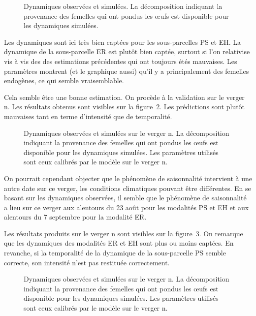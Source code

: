 \begin{figure}[ht]
 \centering
 \caption{Dynamiques observées et simulées. La décomposition indiquant la provenance des femelles qui ont pondus les œufs est disponible pour les dynamiques simulées.}
 \label{fig:D}
\end{figure}


Les dynamiques sont ici très bien captées pour les sous-parcelles PS et EH.
La dynamique de la sous-parcelle ER est plutôt bien captée, surtout si l'on relativise vis à vis des des estimations précédentes qui ont toujours étés mauvaises.
Les paramètres montrent (et le graphique aussi) qu'il y a principalement des femelles endogènes, ce qui semble vraisemblable.



Cela semble être une bonne estimation.
On procède à la validation sur le verger n.
Les résultats obtenus sont visibles sur la figure~\ref{fig:vg2_15s}.
Les prédictions sont plutôt mauvaises tant en terme d'intensité que de temporalité.

\begin{figure}[ht]
 \centering
 \caption{Dynamiques observées et simulées sur le verger n. La décomposition indiquant la provenance des femelles qui ont pondus les œufs est disponible pour les dynamiques simulées.
 Les paramètres utilisés sont ceux calibrés par le modèle sur le verger n.}
 \label{fig:vg2_15s}
\end{figure}


On pourrait cependant objecter que le phénomène de saisonnalité intervient à une autre date sur ce verger, les conditions climatiques pouvant être différentes.
En se basant sur les dynamiques observées, il semble que le phénomène de saisonnalité a lieu sur ce verger aux alentours du 23 août pour les modalités PS et EH et aux alentours du 7 septembre pour la modalité ER.

Les résultats produits sur le verger n sont visibles sur la figure~\ref{fig:D2}.
On remarque que les dynamiques des modalités ER et EH sont plus ou moins captées.
En revanche, si la temporalité de la dynamique de la sous-parcelle PS semble correcte, son intensité n'est pas restituée correctement.
\begin{figure}[ht]
 \centering
 \caption{Dynamiques observées et simulées sur le verger n. La décomposition indiquant la provenance des femelles qui ont pondus les œufs est disponible pour les dynamiques simulées.
 Les paramètres utilisés sont ceux calibrés par le modèle sur le verger n.}
 \label{fig:D2}
\end{figure}



